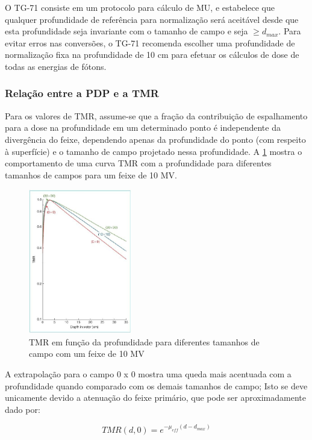 \documentclass[11pt,a4paper]{article}
\begin{document}
    O TG-71 consiste em um protocolo para cálculo de MU, e estabelece que qualquer profundidade de referência para normalização será aceitável desde que esta profundidade seja invariante com o tamanho de campo e seja $\geq d_{max}$. Para evitar erros nas conversões, o TG-71 recomenda escolher uma profundidade de normalização fixa na profundidade de 10 cm para efetuar os cálculos de dose de todas as energias de fótons.

    \subsubsection*{Relação entre a PDP e a TMR}

    Para os valores de TMR, assume-se que a fração da contribuição de espalhamento para a dose na profundidade em um determinado ponto é independente da divergência do feixe, dependendo apenas da profundidade do ponto (com respeito à superfície) e o tamanho de campo projetado nessa profundidade. A \ref{fig:tmrECampo} mostra o comportamento de uma curva TMR com a profundidade para diferentes tamanhos de campos para um feixe de 10 MV. 

    \begin{figure}[h]
        \centering
        \includegraphics[width=0.4\textwidth]{Imagens/tmrECampo.JPG}
        \caption{TMR em função da profundidade para diferentes tamanhos de campo com um feixe de 10 MV}
        \label{fig:tmrECampo}                
    \end{figure}
    
    A extrapolação para o campo 0 x 0 mostra uma queda mais acentuada com a profundidade quando comparado com os demais tamanhos de campo; Isto se deve unicamente devido a atenuação do feixe primário, que pode ser aproximadamente dado por:

        \begin{equation}
            TMR(d, 0) = e^{-\mu_{eff}(d - d_{max})}
        \end{equation}
\end{document}
